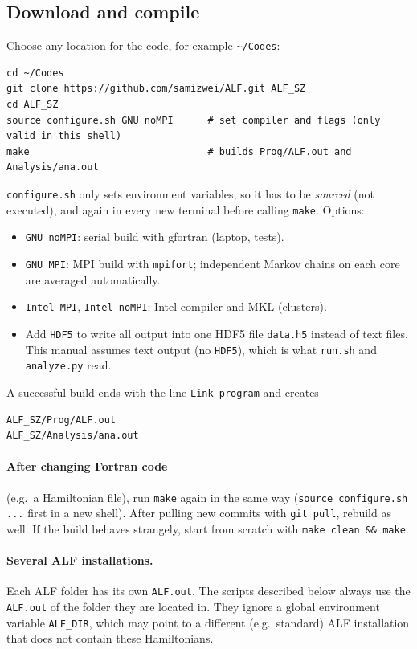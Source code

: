 \documentclass[11pt,a4paper]{article}
\newcommand{\f}[1]{\texttt{#1}}          %
\begin{document}
\subsection{Download and compile}
Choose any location for the code, for example \f{\textasciitilde/Codes}:
\begin{lstlisting}
cd ~/Codes
git clone https://github.com/samizwei/ALF.git ALF_SZ
cd ALF_SZ
source configure.sh GNU noMPI      # set compiler and flags (only valid in this shell)
make                               # builds Prog/ALF.out and Analysis/ana.out
\end{lstlisting}
\f{configure.sh} only sets environment variables, so it has to be \emph{sourced} (not executed),
and again in every new terminal before calling \f{make}. Options:
\begin{itemize}
  \item \f{GNU noMPI}: serial build with gfortran (laptop, tests).
  \item \f{GNU MPI}: MPI build with \f{mpifort}; independent Markov chains on each core are
        averaged automatically.
  \item \f{Intel MPI}, \f{Intel noMPI}: Intel compiler and MKL (clusters).
  \item Add \f{HDF5} to write all output into one HDF5 file \f{data.h5} instead of text files.
        This manual assumes text output (no \f{HDF5}), which is what \f{run.sh} and
        \f{analyze.py} read.
\end{itemize}
A successful build ends with the line \f{Link program} and creates
\begin{lstlisting}
ALF_SZ/Prog/ALF.out
ALF_SZ/Analysis/ana.out
\end{lstlisting}

\paragraph{After changing Fortran code} (e.g.\ a Hamiltonian file), run \f{make} again in the
same way (\f{source configure.sh ...} first in a new shell). After pulling new commits with
\f{git pull}, rebuild as well. If the build behaves strangely, start from scratch with
\f{make clean \&\& make}.

\paragraph{Several ALF installations.}
Each ALF folder has its own \f{ALF.out}. The scripts described below always use the
\f{ALF.out} of the folder they are located in. They ignore a global environment variable
\f{ALF\_DIR}, which may point to a different (e.g.\ standard) ALF installation that does
not contain these Hamiltonians.
\end{document}
